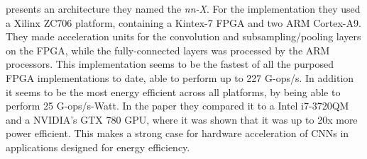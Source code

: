 \cite{Paper} presents an architecture they named the \textit{nn-X}. For the implementation they used a Xilinx ZC706 platform, containing a Kintex-7 FPGA and two ARM Cortex-A9. They made acceleration units for the convolution and subsampling/pooling layers on the FPGA, while the fully-connected layers was processed by the ARM processors. This implementation seems to be the fastest of all the purposed FPGA implementations to date, able to perform up to 227 G-ops/s. In addition it seems to be the most energy efficient across all platforms, by being able to perform 25 G-ops/s-Watt. In the paper they compared it to a Intel i7-3720QM and a NVIDIA’s GTX 780 GPU, where it was shown that it was up to 20x more power efficient. This makes a strong case for hardware acceleration of CNNs in applications designed for energy efficiency. 


